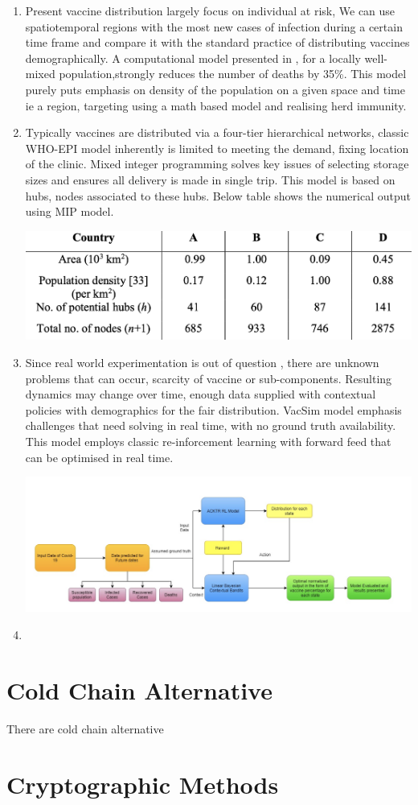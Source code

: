 \documentclass{article}
\begin{document}
\begin{enumerate}
	\item Present vaccine distribution largely focus on individual at risk, We can use spatiotemporal regions with the most new cases of infection during a certain time frame and compare it with the standard practice of distributing vaccines demographically. A computational model presented in\cite{grauer2020strategic} , for a locally well-mixed population,strongly reduces the number of deaths by 35\%. This model purely puts emphasis on density of the population on a given space and time ie a region, targeting using a math based model and realising herd immunity.
	\item Typically vaccines are distributed via a four-tier hierarchical networks, classic WHO-EPI model inherently is limited to meeting the demand, fixing location of the clinic. Mixed integer programming solves key issues of selecting storage sizes and ensures all delivery is made in single trip\cite{yang2020optimizing}. This model is based on hubs, nodes associated to these hubs. Below table shows the numerical output using MIP model.
  
	\includegraphics[scale=0.4]{maths.png}
	\item Since real world experimentation is out of question , there are unknown problems that can occur, scarcity of vaccine or sub-components. Resulting dynamics may change over time, enough data supplied with contextual policies with demographics for the fair distribution. VacSim model emphasis challenges that need solving in real time, with no ground truth availability. This model employs classic re-inforcement learning with forward feed that can be optimised in real time.\cite{awasthi2020vacsim}

\includegraphics[width=\textwidth]{model.png}
	\item 

\end{enumerate} 
 

\section{Cold Chain Alternative}

There are cold chain alternative

\section{Cryptographic Methods}
	

  




\end{document}
